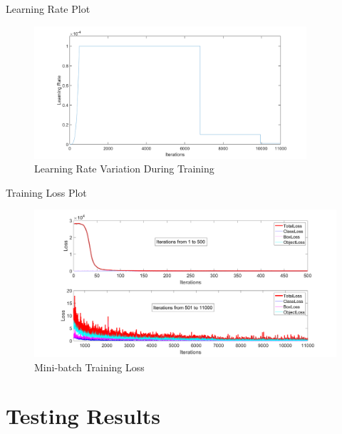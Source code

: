 \documentclass[10pt]{beamer}
\begin{document}
\begin{frame}{Learning Rate Plot}
\begin{figure}
    \centering
    \includegraphics[width=0.9\textwidth]{Images/Learning Rate.png}
    \caption{Learning Rate Variation During Training}
\end{figure}
\end{frame}

\begin{frame}{Training Loss Plot}
\begin{figure}
    \centering
    \includegraphics[width=1\textwidth]{Images/lossplot.png}
    \caption{Mini-batch Training Loss}
\end{figure}
\end{frame}



\section{Testing Results}
\end{document}
